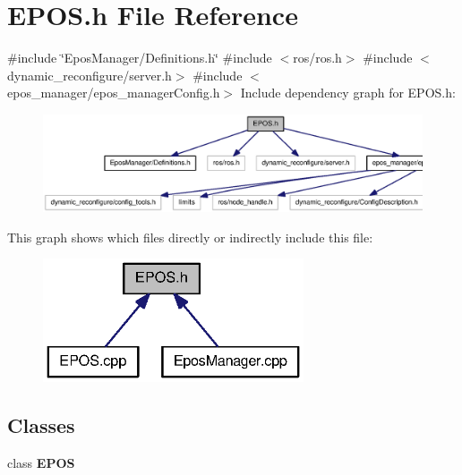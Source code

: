 \section{\-E\-P\-O\-S.\-h \-File \-Reference}
\label{EPOS_8h}
{\ttfamily \#include \char`\"{}\-Epos\-Manager/\-Definitions.\-h\char`\"{}}\*
{\ttfamily \#include $<$ros/ros.\-h$>$}\*
{\ttfamily \#include $<$dynamic\-\_\-reconfigure/server.\-h$>$}\*
{\ttfamily \#include $<$epos\-\_\-manager/epos\-\_\-manager\-Config.\-h$>$}\*
\-Include dependency graph for \-E\-P\-O\-S.\-h\-:
\nopagebreak
\begin{figure}[H]
\begin{center}
\leavevmode
\includegraphics[width=350pt]{EPOS_8h__incl}
\end{center}
\end{figure}
\-This graph shows which files directly or indirectly include this file\-:
\nopagebreak
\begin{figure}[H]
\begin{center}
\leavevmode
\includegraphics[width=218pt]{EPOS_8h__dep__incl}
\end{center}
\end{figure}
\subsection*{\-Classes}
\begin{DoxyCompactItemize}
\item 
class {\bf \-E\-P\-O\-S}
\end{DoxyCompactItemize}

